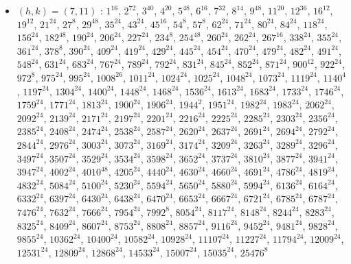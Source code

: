 \begin{itemize}
\item $(h,k)=(7,11)$ : $1^{16}$, $2^{72}$, $3^{40}$, $4^{20}$, $5^{48}$, $6^{16}$, $7^{32}$, $8^{14}$, $9^{48}$, $11^{20}$, $12^{36}$, $16^{12}$, $19^{12}$, $21^{24}$, $27^{8}$, $29^{48}$, $35^{24}$, $43^{24}$, $45^{16}$, $54^{8}$, $57^{8}$, $62^{24}$, $71^{24}$, $80^{24}$, $84^{24}$, $118^{24}$, $156^{24}$, $182^{48}$, $190^{24}$, $206^{24}$, $227^{24}$, $234^{8}$, $254^{48}$, $260^{24}$, $262^{24}$, $267^{16}$, $338^{24}$, $355^{24}$, $361^{24}$, $378^{8}$, $390^{24}$, $409^{24}$, $419^{24}$, $429^{24}$, $445^{24}$, $454^{24}$, $470^{24}$, $479^{24}$, $482^{24}$, $491^{24}$, $548^{24}$, $631^{24}$, $683^{24}$, $767^{24}$, $789^{24}$, $792^{24}$, $831^{24}$, $845^{24}$, $852^{24}$, $871^{24}$, $900^{12}$, $922^{24}$, $972^{8}$, $975^{24}$, $995^{24}$, $1008^{26}$, $1011^{24}$, $1024^{24}$, $1025^{24}$, $1048^{24}$, $1073^{24}$, $1119^{24}$, $1140^{4}$, $1197^{24}$, $1304^{24}$, $1400^{24}$, $1448^{24}$, $1468^{24}$, $1536^{24}$, $1613^{24}$, $1683^{24}$, $1733^{24}$, $1746^{24}$, $1759^{24}$, $1771^{24}$, $1813^{24}$, $1900^{24}$, $1906^{24}$, $1944^{2}$, $1951^{24}$, $1982^{24}$, $1983^{24}$, $2062^{24}$, $2092^{24}$, $2139^{24}$, $2171^{24}$, $2197^{24}$, $2201^{24}$, $2216^{24}$, $2225^{24}$, $2285^{24}$, $2303^{24}$, $2356^{24}$, $2385^{24}$, $2408^{24}$, $2474^{24}$, $2538^{24}$, $2587^{24}$, $2620^{24}$, $2637^{24}$, $2691^{24}$, $2694^{24}$, $2792^{24}$, $2844^{24}$, $2976^{24}$, $3003^{24}$, $3073^{24}$, $3169^{24}$, $3174^{24}$, $3209^{24}$, $3263^{24}$, $3289^{24}$, $3296^{24}$, $3497^{24}$, $3507^{24}$, $3529^{24}$, $3534^{24}$, $3598^{24}$, $3652^{24}$, $3737^{24}$, $3810^{24}$, $3877^{24}$, $3941^{24}$, $3947^{24}$, $4002^{24}$, $4010^{48}$, $4205^{24}$, $4440^{24}$, $4630^{24}$, $4660^{24}$, $4691^{24}$, $4786^{24}$, $4819^{24}$, $4832^{24}$, $5084^{24}$, $5100^{24}$, $5230^{24}$, $5594^{24}$, $5650^{24}$, $5880^{24}$, $5994^{24}$, $6136^{24}$, $6164^{24}$, $6332^{24}$, $6397^{24}$, $6430^{24}$, $6438^{24}$, $6470^{24}$, $6653^{24}$, $6667^{24}$, $6721^{24}$, $6785^{24}$, $6787^{24}$, $7476^{24}$, $7632^{24}$, $7666^{24}$, $7954^{24}$, $7992^{8}$, $8054^{24}$, $8117^{24}$, $8148^{24}$, $8244^{24}$, $8283^{24}$, $8325^{24}$, $8409^{24}$, $8607^{24}$, $8753^{24}$, $8808^{24}$, $8857^{24}$, $9116^{24}$, $9452^{24}$, $9481^{24}$, $9828^{24}$, $9855^{24}$, $10362^{24}$, $10400^{24}$, $10582^{24}$, $10928^{24}$, $11107^{24}$, $11227^{24}$, $11794^{24}$, $12009^{24}$, $12531^{24}$, $12809^{24}$, $12868^{24}$, $14533^{24}$, $15007^{24}$, $15035^{24}$, $25476^{8}$

\end{itemize}
